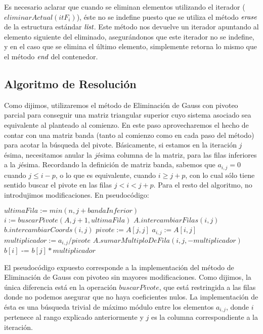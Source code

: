   Es necesario aclarar que cuando se eliminan elementos utilizando el iterador ($eliminarActual(itF_i)$), éste no se indefine puesto que se utiliza el método $\emph{erase}$ de la estructura estándar $\emph{list}$. Este método nos devuelve un iterador apuntando al elemento siguiente del eliminado, asegurándonos que este iterador no se indefine, y en el caso que se elimina el último elemento, simplemente retorna lo mismo que el método $\emph{end}$ del contenedor.

\subsection{Algoritmo de Resolución}
Como dijimos, utilizaremos el método de Eliminación de Gauss con pivoteo parcial para conseguir una matriz triangular superior cuyo sistema asociado sea equivalente al planteado al comienzo. En este paso aprovecharemos el hecho de contar con una matriz banda (tanto al comienzo como en cada paso del método) para acotar la búsqueda del pivote. Básicamente, si estamos en la iteración $j$ésima, necesitamos anular la $j$ésima columna de la matriz, para las filas inferiores a la $j$ésima. Recordando la definición de matriz banda, sabemos que $a_{i,j} = 0$ cuando $j \leq i-p$, o lo que es equivalente, cuando $i \geq j+p$, con lo cual sólo tiene sentido buscar el pivote en las filas $j < i < j+p$. Para el resto del algoritmo, no introdujimos modificaciones. En pseudocódigo:
 \begin{algorithm}
\caption{$triangular(A, b, bandaInferior)$}
\begin{algorithmic}
	\State $ultimaFila := min(n, j+bandaInferior)$
    \State $i := buscarPivote(A, j+1, ultimaFila)$
            \State $A.intercambiarFilas(i, j)$
			\State $b.intercambiarCoords(i,j)$
        \EndIf
     \State $pivote := A[j, j]$
        \State $a_{i,j} := A[i,j]$ %
	            \State $multiplicador := a_{i,j} / pivote$
	            \State $A.sumarMultiploDeFila(i, j, -multiplicador)$
	            \State $b[i]$ -= $b[j]*multiplicador$
	     \EndIf
      \EndFor
\EndFor
\end{algorithmic}
\end{algorithm}

El pseudocódigo expuesto corresponde a la implementación del método de Eliminación de Gauss con pivoteo sin mayores modificaciones. Como dijimos, la única diferencia está en la operación $buscarPivote$, que está restringida a las filas donde no podemos asegurar que no haya coeficientes nulos. La implementación de ésta es una búsqueda trivial de máximo módulo entre los elementos $a_{i,j}$, donde $i$ pertenece al rango explicado anteriormente y $j$ es la columna correspondiente a la iteración.
 

